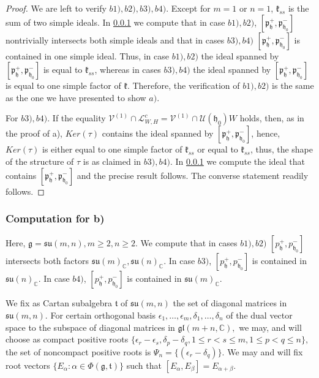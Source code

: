 \documentclass[12pt]{amsart}
\theoremstyle{definition}
\theoremstyle{remark}
\newcommand{\g}{\mathfrak{g}}
\newcommand{\h}{\mathfrak{h}}
\renewcommand{\k}{{\mathfrak k}}
\newcommand{\p}{\mathfrak p}
\renewcommand{\t}{{\mathfrak t}}
\numberwithin{equation}{section}
\begin{document}
\begin{proof}
\medskip


 We are left to  verify $b1), b2), b3), b4)$.  Except for $m=1$ or $n=1$,    $\k_{ss}$ is the sum of two simple ideals. In \ref{sub:b)} we compute that in case $b1), b2)$,  $[\p_\h^+,\p_{\h_0}^-]$  nontrivially intersects both simple ideals and that in cases $b3), b4)$ $[\p_\h^+,\p_{\h_0}^-]$ is contained in one simple ideal. Thus, in case $b1), b2)$ the ideal spanned by $[\p_\h^+,\p_{\h_0}^-]$ is equal to $\k_{ss}$, whereas in cases $ b3), b4)$ the ideal spanned by  $[\p_\h^+,\p_{\h_0}^-]$ is equal to one simple factor of $\k$. Therefore, the verification of $ b1),b2)$ is the same as the one we have presented to show $a)$.

 For $b3), b4)$. If the equality $ \mathcal V^{(1)}\cap \mathcal L_{W,H}^c  =  \mathcal V^{(1)}\cap \mathcal  U(\h_0)W$  holds, then, as in the proof of a),  $Ker(\tau)$ contains the ideal spanned by $[\p_\h^+,\p_{\h_0}^-]$, hence, $Ker(\tau)$ is either equal to one simple factor of $\k_{ss}$ or equal to $\k_{ss}$, thus, the shape of the  structure of  $\tau$ is as claimed in $b3), b4)$. In \ref{sub:b)} we compute the ideal that contains $[\p_\h^+,\p_{\h_0}^-]$ and the precise result follows.  The converse statement readily follows. \end{proof}




 \subsubsection{Computation for b)}\label{sub:b)} Here,  $\g=\mathfrak{su}(m,n), m\geq 2, n\geq 2$.
 We compute that in cases $b1), b2)$   $[p_\h^+,p_{\h_0}^-]$   intersects both factors $\mathfrak{su}(m)_\mathbb C, \mathfrak{su}(n)_\mathbb C$. In case $b3)$,  $[p_\h^+,p_{\h_0}^-]$  is    contained in  $  \mathfrak{su}(n)_\mathbb C$. In case $b4)$,  $[p_\h^+,p_{\h_0}^-]$  is   contained in  $  \mathfrak{su}(m)_\mathbb C$.


  We fix as Cartan subalgebra   $\t$ of $\mathfrak {su}(m,n)$ the set of diagonal matrices in $\mathfrak {su}(m,n).$   For certain orthogonal basis $\epsilon_1, \dots ,\epsilon_m, \delta_1, \dots, \delta_n$ of the dual vector space to the subspace of diagonal matrices in $\mathfrak{gl}(m+n, \mathbb C),$ we may, and will choose  as compact positive roots $ \{ \epsilon_r - \epsilon_s, \delta_p -\delta_q, 1 \leq  r < s \leq m, 1 \leq p < q \leq n \},$ the set of noncompact positive  roots is $ \Psi_n= \{  (\epsilon_r - \delta_q) \}.$ We may and will fix root vectors $\{E_\alpha : \alpha \in \Phi(\g,\t)\}$ such that $[E_\alpha, E_\beta]=E_{\alpha +\beta}$.
\end{document}
